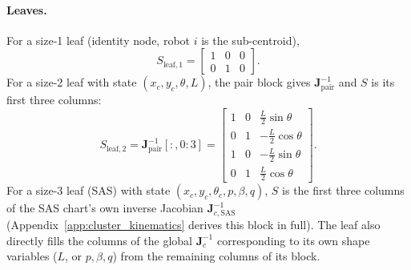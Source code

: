 \documentclass[12pt, letterpaper, oneside]{report}
\begin{document}
\paragraph{Leaves.} For a size-1 leaf (identity node, robot $i$ is the
sub-centroid),
\begin{equation}
S_{\text{leaf},1} = \begin{bmatrix} 1 & 0 & 0 \\ 0 & 1 & 0 \end{bmatrix}.
\end{equation}
For a size-2 leaf with state $(x_c,y_c,\theta,L)$, the pair block gives
$\mathbf{J}_{\text{pair}}^{-1}$ and $S$ is its first three columns:
\begin{equation}
S_{\text{leaf},2} = \mathbf{J}_{\text{pair}}^{-1}[:,0{:}3] =
\begin{bmatrix}
1 & 0 & \tfrac{L}{2}\sin\theta \\
0 & 1 & -\tfrac{L}{2}\cos\theta \\
1 & 0 & -\tfrac{L}{2}\sin\theta \\
0 & 1 & \tfrac{L}{2}\cos\theta
\end{bmatrix}.
\end{equation}
For a size-3 leaf (SAS) with state $(x_c,y_c,\theta_c,p,\beta,q)$, $S$ is the
first three columns of the SAS chart's own inverse Jacobian
$\mathbf{J}_{c,\text{SAS}}^{-1}$ (Appendix~\ref{app:cluster_kinematics}
derives this block in full). The leaf also directly fills the columns of
the global $\mathbf{J}_c^{-1}$ corresponding to its own shape variables
($L$, or $p,\beta,q$) from the remaining columns of its block.
\end{document}
